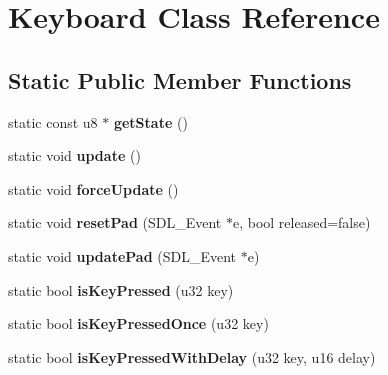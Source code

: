 \hypertarget{classKeyboard}{\section{Keyboard Class Reference}
\label{classKeyboard}
}
\subsection*{Static Public Member Functions}
\begin{DoxyCompactItemize}
\item 
\hypertarget{classKeyboard_ae75418ec058c9faa11da8a00600debf0}{static const u8 $\ast$ {\bfseries get\-State} ()}\label{classKeyboard_ae75418ec058c9faa11da8a00600debf0}

\item 
\hypertarget{classKeyboard_a6410f07ddc53561a82d5328d8b330aab}{static void {\bfseries update} ()}\label{classKeyboard_a6410f07ddc53561a82d5328d8b330aab}

\item 
\hypertarget{classKeyboard_a9335bbe850023636c516fd3097b80682}{static void {\bfseries force\-Update} ()}\label{classKeyboard_a9335bbe850023636c516fd3097b80682}

\item 
\hypertarget{classKeyboard_acec5b8eed39c370d54f8a37f836599eb}{static void {\bfseries reset\-Pad} (S\-D\-L\-\_\-\-Event $\ast$e, bool released=false)}\label{classKeyboard_acec5b8eed39c370d54f8a37f836599eb}

\item 
\hypertarget{classKeyboard_a28b59927237e9ca52cd30a1f6edcd543}{static void {\bfseries update\-Pad} (S\-D\-L\-\_\-\-Event $\ast$e)}\label{classKeyboard_a28b59927237e9ca52cd30a1f6edcd543}

\item 
\hypertarget{classKeyboard_a9b181f95b0743003ac6ddefa4d2ac788}{static bool {\bfseries is\-Key\-Pressed} (u32 key)}\label{classKeyboard_a9b181f95b0743003ac6ddefa4d2ac788}

\item 
\hypertarget{classKeyboard_a4be9c375121e8de66e858b2b2f01cd5f}{static bool {\bfseries is\-Key\-Pressed\-Once} (u32 key)}\label{classKeyboard_a4be9c375121e8de66e858b2b2f01cd5f}

\item 
\hypertarget{classKeyboard_a5a39520afd20c574bf3d574069005449}{static bool {\bfseries is\-Key\-Pressed\-With\-Delay} (u32 key, u16 delay)}\label{classKeyboard_a5a39520afd20c574bf3d574069005449}

\end{DoxyCompactItemize}
